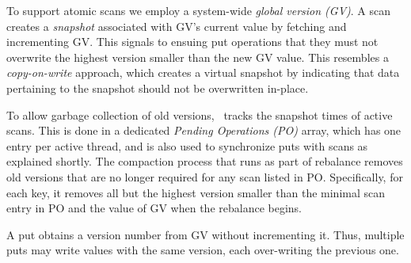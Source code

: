 
To support atomic scans we employ a system-wide \emph{global version (GV)}. 
A scan  creates a \emph{snapshot} associated with GV's current value by fetching and incrementing GV.
This signals to ensuing put operations that they must not overwrite the highest
version smaller than the new GV value.
This resembles a \emph{copy-on-write} approach, which  creates a virtual snapshot by 
indicating that data pertaining to the snapshot should not be overwritten in-place.  

To allow garbage collection of old versions, \sys\  tracks the snapshot times of active scans.
This is done in a dedicated  \emph{Pending Operations (PO)} array, which has one entry per active thread,
and is also used to synchronize puts with scans as explained shortly.
The compaction process that runs as part of rebalance removes old versions that are no longer required for any  
scan listed in PO. Specifically, for each key, it removes all but the highest version smaller than the minimal
scan entry in PO and the value of GV when the rebalance begins. 



A put obtains a version number from GV without incrementing it. Thus, multiple puts may write values with the same version, each over-writing the previous one. 

